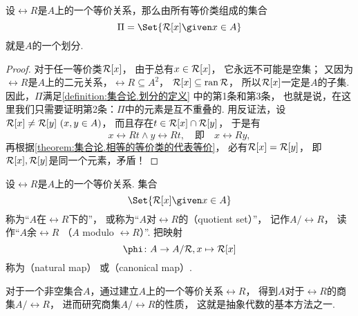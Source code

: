 \begin{theorem}
设\(\rel{R}\)是\(A\)上的一个等价关系，那么由所有等价类组成的集合\begin{equation*}
	\Pi = \Set{ \EquivalenceClassBH{x}[\rel{R}] \given x \in A }
\end{equation*}就是\(A\)的一个划分.
\begin{proof}
对于任一等价类\(\EquivalenceClassBH{x}[\rel{R}]\)，
由于总有\(x \in \EquivalenceClassBH{x}[\rel{R}]\)，
它永远不可能是空集；
又因为\(\rel{R}\)是\(A\)上的二元关系，\(\rel{R} \subseteq A^2\)，
\(\EquivalenceClassBH{x}[\rel{R}] \subseteq \ran \rel{R}\)，
所以\(\EquivalenceClassBH{x}[\rel{R}]\)一定是\(A\)的子集.
因此，\(\Pi\)满足\cref{definition:集合论.划分的定义} 中的第1条和第3条，
也就是说，在这里我们只需要证明第2条：\(\Pi\)中的元素是互不重叠的.
用反证法，设\(\EquivalenceClassBH{x}[\rel{R}] \neq \rel{R}[y]\ (x,y \in A)\)，
而且存在\(t \in \EquivalenceClassBH{x}[\rel{R}] \cap \rel{R}[y]\)，
于是有\begin{equation*}
	x \rel{R} t \land y \rel{R} t,
	\quad\text{即}\quad
	x \rel{R} y,
\end{equation*}
再根据\cref{theorem:集合论.相等的等价类的代表等价}，
必有\(\EquivalenceClassBH{x}[\rel{R}] = \rel{R}[y]\)，
即\(\EquivalenceClassBH{x}[\rel{R}],\rel{R}[y]\)是同一个元素，矛盾！
\end{proof}
\end{theorem}

\begin{definition}\label{definition:集合论.商集的定义}
设\(\rel{R}\)是\(A\)上的一个等价关系.
集合\begin{equation*}
	\Set{ \EquivalenceClassBH{x}[\rel{R}] \given x \in A }
\end{equation*}称为“\(A\)在\(\rel{R}\)下的”，
或称为“\(A\)对\(\rel{R}\)的（quotient set）”，
记作\(A/\rel{R}\)，
读作“\(A\)余\(\rel{R}\)
（\(A\) modulo \(\rel{R}\)）”.
把映射\begin{equation*}
	\phi\colon A \to A/\rel{R}, x \mapsto \EquivalenceClassBH{x}[\rel{R}]
\end{equation*}称为（natural map）%
或（canonical map）.
\end{definition}
对于一个非空集合\(A\)，通过建立\(A\)上的一个等价关系\(\rel{R}\)，
得到\(A\)对于\(\rel{R}\)的商集\(A/\rel{R}\)，
进而研究商集\(A/\rel{R}\)的性质，
这就是抽象代数的基本方法之一.

